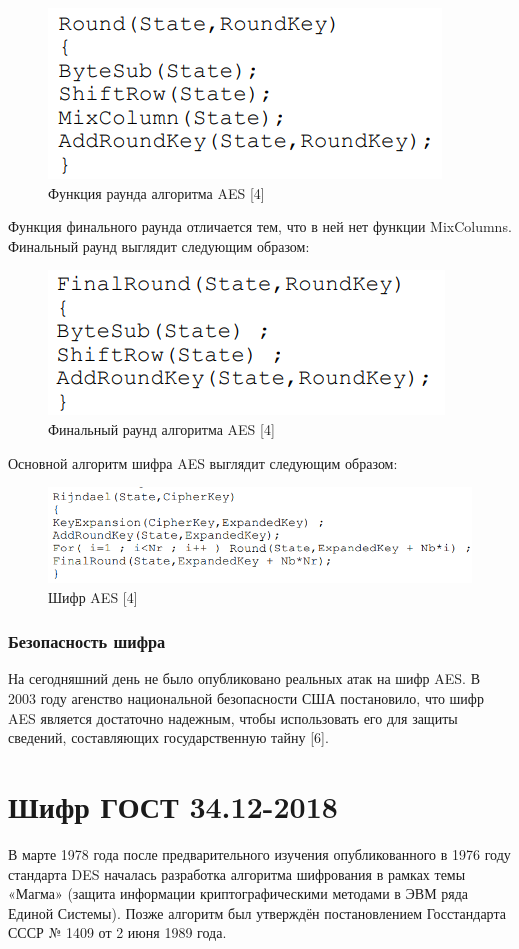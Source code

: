 \documentclass[colorthm]{./civarticle}
\begin{document}
\begin{figure}[H]
    \centering
    \includegraphics[width=0.25\linewidth]{round.png}
    \caption{Функция раунда алгоритма AES [4]}
    \label{fig:enter-label}
\end{figure}

Функция финального раунда отличается тем, что в ней нет функции MixColumns. Финальный раунд выглядит следующим образом:

\begin{figure}[H]
    \centering
    \includegraphics[width=0.25\linewidth]{f_round.png}
    \caption{Финальный раунд алгоритма AES [4]}
    \label{fig:enter-label}
\end{figure}

Основной алгоритм шифра AES выглядит следующим образом:

\begin{figure}[H]
    \centering
    \includegraphics[width=0.5\linewidth]{aes.png}
    \caption{Шифр AES [4]}
    \label{fig:enter-label}
\end{figure}

\subsubsection{Безопасность шифра}
На сегодняшний день не было опубликовано реальных атак на шифр AES. В 2003 году агенство национальной безопасности США постановило, что шифр AES является достаточно надежным, чтобы использовать его для защиты сведений, составляющих государственную тайну [6].


\section{Шифр ГОСТ 34.12-2018 \textquotedbl}

В марте 1978 года после предварительного изучения опубликованного в 1976 году стандарта DES началась разработка алгоритма шифрования в рамках темы «Магма» (защита информации криптографическими методами в ЭВМ ряда Единой Системы). Позже алгоритм был утверждён постановлением Госстандарта СССР № 1409 от 2 июня 1989 года.
\end{document}

